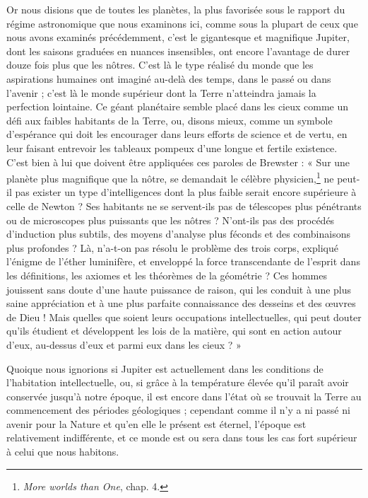\documentclass[a4paper, 11pt, oneside]{article}
\begin{document}
Or nous disions que de toutes les planètes, la plus favorisée sous le rapport du régime astronomique que nous examinons ici, comme sous la plupart de ceux que nous avons examinés précédemment, c'est le gigantesque et magnifique Jupiter, dont les saisons graduées en nuances insensibles, ont encore l'avantage de durer douze fois plus que les nôtres. C'est là le type réalisé du monde que les aspirations humaines ont imaginé au-delà des temps, dans le passé ou dans l'avenir ; c'est là le monde supérieur dont la Terre n'atteindra jamais la perfection lointaine. Ce géant planétaire semble placé dans les cieux comme un défi aux faibles habitants de la Terre, ou, disons mieux, comme un symbole d'espérance qui doit les encourager dans leurs efforts de science et de vertu, en leur faisant entrevoir les tableaux pompeux d'une longue et fertile existence. C'est bien à lui que doivent être appliquées ces paroles de Brewster : « Sur une planète plus magnifique que la nôtre, se demandait le célèbre physicien,\footnote{\emph{More worlds than One}, chap. 4.} ne peut-il pas exister un type d'intelligences dont la plus faible serait encore supérieure à celle de Newton ? Ses habitants ne se servent-ils pas de télescopes plus pénétrants ou de microscopes plus puissants que les nôtres ? N'ont-ils pas des procédés d'induction plus subtils, des moyens d'analyse plus féconds et des combinaisons plus profondes ? Là, n'a-t-on pas résolu le problème des trois corps, expliqué l'énigme de l'éther luminifère, et enveloppé la force transcendante de l'esprit dans les définitions, les axiomes et les théorèmes de la géométrie ? Ces hommes jouissent sans doute d'une haute puissance de raison, qui les conduit à une plus saine appréciation et à une plus parfaite connaissance des desseins et des œuvres de Dieu ! Mais quelles que soient leurs occupations intellectuelles, qui peut douter qu'ils étudient et développent les lois de la matière, qui sont en action autour d'eux, au-dessus d'eux et parmi eux dans les cieux ? »

Quoique nous ignorions si Jupiter est actuellement dans les conditions de l'habitation intellectuelle, ou, si grâce à la température élevée qu'il paraît avoir conservée jusqu'à notre époque, il est encore dans l'état où se trouvait la Terre au commencement des périodes géologiques ; cependant comme il n'y a ni passé ni avenir pour la Nature et qu'en elle le présent est éternel, l'époque est relativement indifférente, et ce monde est ou sera dans tous les cas fort supérieur à celui que nous habitons.
\end{document}
